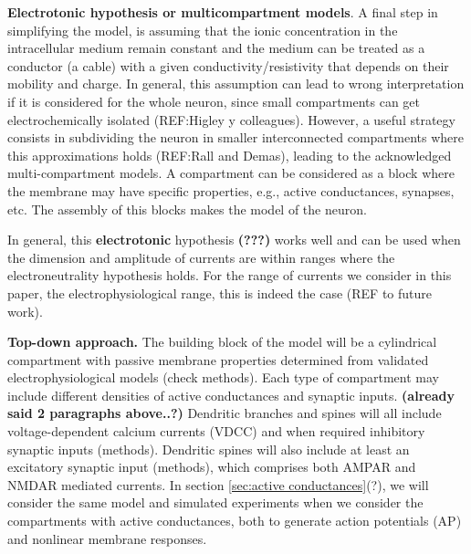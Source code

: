\documentclass[10pt,letterpaper]{article}
\begin{document}
{\bf Electrotonic hypothesis or multicompartment models}. A final step in simplifying the model, is assuming that the ionic concentration in the intracellular medium remain constant and the medium can be treated as a conductor (a cable) with a given conductivity/resistivity that depends on their mobility and charge.
In general, this assumption can lead to wrong interpretation if it is considered for the whole neuron, since small compartments can get electrochemically isolated (REF:Higley y colleagues). However, a useful strategy consists in subdividing the neuron in smaller interconnected compartments where this approximations holds (REF:Rall and Demas), leading to the acknowledged multi-compartment models. A compartment can be considered as a block where the membrane may have specific properties, e.g., active conductances, synapses, etc. The assembly of this blocks makes the model of the neuron.

In general, this \textbf{electrotonic} hypothesis \textbf{(???)} works well and can be used when the dimension and amplitude of currents are within ranges where the electroneutrality hypothesis holds. For the range of currents we consider in this paper, the electrophysiological range, this is indeed the case (REF to future work).


{\bf Top-down approach.} The building block of the model will be a cylindrical compartment with passive membrane properties determined from validated electrophysiological models (check methods). Each type of compartment may include different densities of active conductances and synaptic inputs. \textbf{(already said 2 paragraphs above..?)} Dendritic branches and spines will all include voltage-dependent calcium currents (VDCC) and when required inhibitory synaptic inputs (methods). Dendritic spines will also include at least an excitatory synaptic input (methods), which comprises both AMPAR and NMDAR mediated currents. In section \ref{sec:active conductances}(?), we will consider the same model and simulated experiments when we consider the compartments with active conductances, both to generate action potentials (AP) and nonlinear membrane responses.
\end{document}
